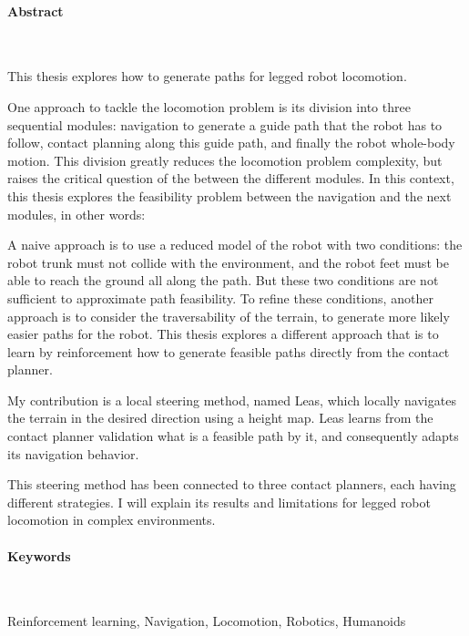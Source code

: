 \newpage

\noindent\makebox[\linewidth]{\rule{0.6\textwidth}{2pt}}

\small

\paragraph{Abstract}~

This thesis explores how to generate paths for legged robot locomotion.

One approach to tackle the locomotion problem is its division into three sequential modules: navigation to generate a guide path that the robot has to follow, contact planning along this guide path, and finally the robot whole-body motion. This division greatly reduces the locomotion problem complexity, but raises the critical question of the  between the different modules. In this context, this thesis explores the feasibility problem between the navigation and the next modules, in other words: 

A naive approach is to use a reduced model of the robot with two conditions: the robot trunk must not collide with the environment, and the robot feet must be able to reach the ground all along the path. But these two conditions are not sufficient to approximate path feasibility. To refine these conditions, another approach is to consider the traversability of the terrain, to generate more likely easier paths for the robot. This thesis explores a different approach that is to learn by reinforcement how to generate feasible paths directly from the contact planner.

My contribution is a local steering method, named Leas, which locally navigates the terrain in the desired direction using a height map. Leas learns from the contact planner validation what is a feasible path by it, and consequently adapts its navigation behavior.

This steering method has been connected to three contact planners, each having different strategies. I will explain its results and limitations for legged robot locomotion in complex environments.


\paragraph{Keywords}~

Reinforcement learning, Navigation, Locomotion, Robotics, Humanoids

